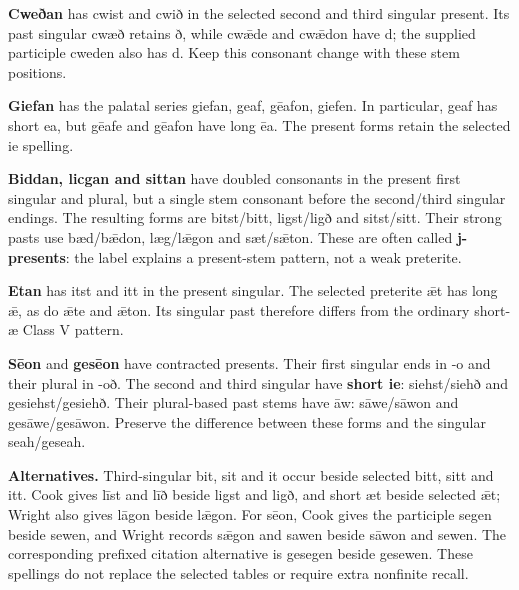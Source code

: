 \par\endgroup
\textbf{Cweðan} has cwist and cwið in the selected second and third singular present. Its past singular cwæð retains ð, while cwǣde and cwǣdon have d; the supplied participle cweden also has d. Keep this consonant change with these stem positions.

\textbf{Giefan} has the palatal series giefan, geaf, gēafon, giefen. In particular, geaf has short ea, but gēafe and gēafon have long ēa. The present forms retain the selected ie spelling.

\textbf{Biddan, licgan and sittan} have doubled consonants in the present first singular and plural, but a single stem consonant before the second/\allowbreak{}third singular endings. The resulting forms are bitst/\allowbreak{}bitt, ligst/\allowbreak{}ligð and sitst/\allowbreak{}sitt. Their strong pasts use bæd/\allowbreak{}bǣdon, læg/\allowbreak{}lǣgon and sæt/\allowbreak{}sǣton. These are often called \textbf{j-presents}: the label explains a present-stem pattern, not a weak preterite.

\textbf{Etan} has itst and itt in the present singular. The selected preterite ǣt has long ǣ, as do ǣte and ǣton. Its singular past therefore differs from the ordinary short-æ Class V pattern.

\textbf{Sēon} and \textbf{gesēon} have contracted presents. Their first singular ends in -o and their plural in -oð. The second and third singular have \textbf{short ie}: siehst/\allowbreak{}siehð and gesiehst/\allowbreak{}gesiehð. Their plural-based past stems have āw: sāwe/\allowbreak{}sāwon and gesāwe/\allowbreak{}gesāwon. Preserve the difference between these forms and the singular seah/\allowbreak{}geseah.

\textbf{Alternatives.} Third-singular bit, sit and it occur beside selected bitt, sitt and itt. Cook gives līst and līð beside ligst and ligð, and short æt beside selected ǣt; Wright also gives lāgon beside lǣgon. For sēon, Cook gives the participle segen beside sewen, and Wright records sǣgon and sawen beside sāwon and sewen. The corresponding prefixed citation alternative is gesegen beside gesewen. These spellings do not replace the selected tables or require extra nonfinite recall.

